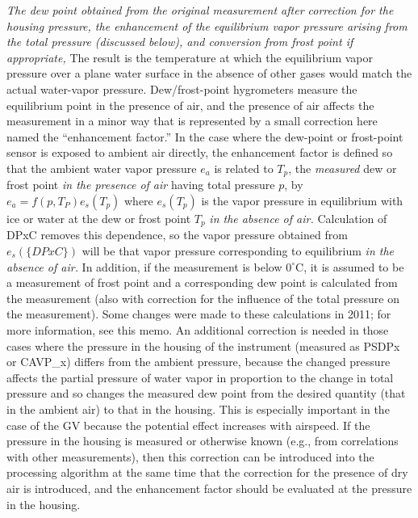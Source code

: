\documentclass[
  english,
]{book}
\begin{document}
\emph{The dew point obtained from the original measurement after
correction for the housing pressure, the enhancement of the equilibrium
vapor pressure arising from the total pressure (discussed below), and
conversion from frost point if appropriate,} The result is the
temperature at which the equilibrium vapor pressure over a plane water
surface in the absence of other gases would match the actual water-vapor
pressure. Dew/frost-point hygrometers measure the equilibrium point in
the presence of air, and the presence of air affects the measurement in
a minor way that is represented by a small correction here named the
``enhancement factor.'' In the case where the dew-point or frost-point
sensor is exposed to ambient air directly, the enhancement factor is
defined so that the ambient water vapor pressure \(e_a\) is related to
\(T_p\), the \emph{measured} dew or frost point \emph{in the presence of
air} having total pressure \(p\), by \(e_a=f(p,T_P)e_s(T_p)\) where
\(e_s(T_p)\) is the vapor pressure in equilibrium with ice or water at
the dew or frost point \(T_p\) \emph{in the absence of air.} Calculation
of DPxC removes this dependence, so the vapor pressure obtained from
\(e_s(\{DPxC\})\) will be that vapor pressure corresponding to
equilibrium \emph{in the absence of air.} In addition, if the
measurement is below \(0^\circ\mathrm{C}\), it is assumed to be a
measurement of frost point and a corresponding dew point is calculated
from the measurement (also with correction for the influence of the
total pressure on the measurement). Some changes were made to these
calculations in 2011; for more information, see this memo. An additional
correction is needed in those cases where the pressure in the housing of
the instrument (measured as PSDPx or CAVP\_x) differs from the ambient
pressure, because the changed pressure affects the partial pressure of
water vapor in proportion to the change in total pressure and so changes
the measured dew point from the desired quantity (that in the ambient
air) to that in the housing. This is especially important in the case of
the GV because the potential effect increases with airspeed. If the
pressure in the housing is measured or otherwise known (e.g., from
correlations with other measurements), then this correction can be
introduced into the processing algorithm at the same time that the
correction for the presence of dry air is introduced, and the
enhancement factor should be evaluated at the pressure in the housing.
\end{document}
